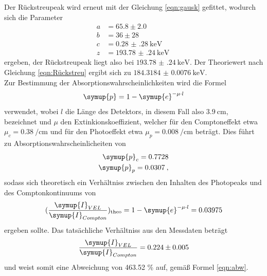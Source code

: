 Der Rückstreupeak wird erneut mit der Gleichung \ref{eqn:gausk} gefittet, wodurch sich
die Parameter
\begin{align*}
  a &= 65.8 \pm 2.0 \\
  b &= 36 \pm 28 \\
  c &= \SI{0.28(28)}{\kilo\electronvolt}\\
  z &= \SI{193.78(24)}{\kilo\electronvolt} \:
\end{align*}
ergeben, der Rückstreupeak liegt also bei $\SI{193.78(24)}{\kilo\electronvolt}$.
Der Theoriewert nach Gleichung \ref{eqn:Rückstreu} ergibt sich zu $\SI{184.3184(76)}{\kilo\electronvolt}$.
\\
Zur Bestimmung der Absorptionswahrscheinlichkeiten wird die Formel
\begin{equation}
  \symup{p} = 1-\symup{e}^{-\mu \cdot l}
\end{equation}
verwendet, wobei $l$ die Länge des Detektors, in diesem Fall also $\SI{3.9}{\centi\meter}$, bezeichnet
und $\mu$ den Extinkionskoeffizient, welcher für den Comptoneffekt etwa
$\mu_{c}=\SI{0.38}{\per\centi\meter}$ und für den Photoeffekt etwa
$\mu_{p}=\SI{0.008}{\per\centi\meter}$ beträgt.
Dies führt zu Absorptionswahrscheinlicheiten von
\begin{align*}
  \symup{p}_{c} = 0.7728 \\
  \symup{p}_{p} = 0.0307 \: ,
\end{align*}
sodass sich theoretisch ein Verhältniss zwischen den Inhalten des Photopeaks und des
Comptonkontinuums von
\begin{equation*}
  (\frac{\symup{I}_{VEL}}{\symup{I}_{Compton}})_{\text{theo}} = 1-\symup{e}^{-\mu \cdot l}
  = 0.03975
\end{equation*}
ergeben sollte. Das tatsächliche Verhältniss aus den Messdaten beträgt
\begin{equation*}
  \frac{\symup{I}_{VEL}}{\symup{I}_{Compton}}
  = 0.224 \pm 0.005
\end{equation*}
und weist somit eine Abweichung von 463.52 \% auf, gemäß Formel \ref{eqn:abw}.


